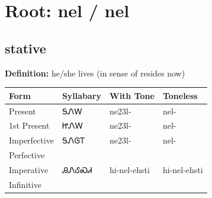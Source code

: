 \documentclass{article}%
\begin{document}
%
\normalsize%
\section*{Root: nel / nel}%
\subsection*{stative}%
\textbf{Definition: }%
he/she lives (in sense of resides now)%
\\[0.5em]%
\begin{tabular}{|l|l|l|l|}%
\hline%
\textbf{Form}&\textbf{Syllabary}&\textbf{With Tone}&\textbf{Toneless}\\%
\hline%
Present&ᎦᏁᎳ&ne23l{-}&nel{-}\\%
1st Present&ᏥᏁᎳ&ne23l{-}&nel{-}\\%
Imperfective&ᎦᏁᎶᎢ&ne23l{-}&nel{-}\\%
Perfective&&&\\%
Imperative&ᎯᏁᎴᏍᏗ&hi{-}nel{-}ehsti&hi{-}nel{-}ehsti\\%
Infinitive&&&\\%
\hline%
\end{tabular}%
\\[1em]%
\end{document}
